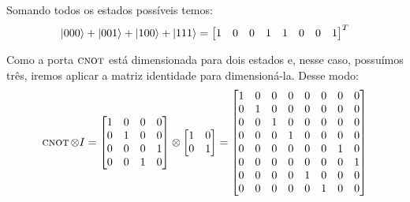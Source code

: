 Somando todos os estados possíveis temos:
\begin{equation}\label{eq:3estados}
\ket{000}+\ket{001}+\ket{100}+\ket{111}= \begin{bmatrix}
1 & 0 & 0 & 1 & 1 & 0 & 0 & 1
\end{bmatrix}^T
\end{equation}

Como a porta \(\operatorname{\textsc{cnot}}\) está dimensionada para dois estados e, nesse caso, possuímos três, iremos aplicar a matriz identidade para dimensioná-la. Desse modo:
\begin{equation}\label{eq:cnotI}
\operatorname{\textsc{cnot}} \otimes I = \begin{bmatrix}
		1 & 0 & 0 & 0 \\
		0 & 1 & 0 & 0 \\
		0 & 0 & 0 & 1 \\
		0 & 0 & 1 & 0
		\end{bmatrix} \otimes \begin{bmatrix}
		1 & 0 \\
		0 & 1
		\end{bmatrix} = \begin{bmatrix}
		1 & 0 & 0 & 0 & 0 & 0 & 0 & 0 \\
		0 & 1 & 0 & 0 & 0 & 0 & 0 & 0 \\
		0 & 0 & 1 & 0 & 0 & 0 & 0 & 0 \\
		0 & 0 & 0 & 1 & 0 & 0 & 0 & 0 \\
		0 & 0 & 0 & 0 & 0 & 0 & 1 & 0 \\
		0 & 0 & 0 & 0 & 0 & 0 & 0 & 1 \\
		0 & 0 & 0 & 0 & 1 & 0 & 0 & 0 \\
		0 & 0 & 0 & 0 & 0 & 1 & 0 & 0 		
		\end{bmatrix}
\end{equation}

